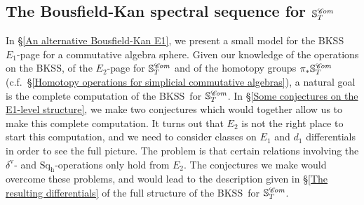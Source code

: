 \documentclass[11pt]{amsart} \renewcommand{\baselinestretch}{1.2}
\theoremstyle{plain}
\numberwithin{equation}{section} %
\theoremstyle{plain}
\numberwithin{equation}{chapter} %
\newcommand{\scrC}{\mathscr{C}}
\newcommand{\calw}{\mathcal{W}}
\newcommand{\calMhv}{\mathcal{M}_\mathrm{hv}}
\newcommand{\HA}[1]{H#1}
\newcommand{\quadgrad}[1]{\mathrm{q}_{#1}}
\newcommand{\algs}{{\scrC\!\textit{\normalfont\textit{om}}}}
\newcommand{\E}[5]{[E^{#1}_{#2}#3]^{#4}_{#5}}
\newcommand{\uver}{^\mathrm{v}}
\newcommand{\dhor}{_\mathrm{h}}
\newcommand{\Sqh}{\mathrm{Sq}\dhor}
\newcommand{\deltav}{\delta\uver}
\newcommand{\dual}{\mathbf{D}}
\newcommand{\BKSS}{BKSS}
\newcommand{\SubsectionOrSection}[1]{\subsection{#1}}
\begin{document}
\begin{Introduction}
\SubsectionOrSection{The Bousfield-Kan spectral sequence for $\mathbb{S}^{\algs}_T$}
\label{the BKSS for S introsection}
In \S\ref{An alternative Bousfield-Kan E1}, we present a small model for the \BKSS\ $E_1$-page for a commutative algebra sphere. 
Given our knowledge of the operations on the \BKSS, of the $E_2$-page for $\mathbb{S}^{\algs}_T$ and of the homotopy groups $\pi_*\mathbb{S}^{\algs}_T$ (c.f.\ \S\ref{Homotopy operations for simplicial commutative algebras}), a natural goal is the complete computation of the \BKSS\ for $\mathbb{S}^{\algs}_T$. In \S\ref{Some conjectures on the E1-level structure}, we make two conjectures which would together allow us to make this complete computation. It turns out that $E_2$ is not the right place to start this computation, and we need to consider classes on $E_1$ and $d_1$ differentials in order to see the full picture. The problem is that certain relations involving the $\deltav$- and $\Sqh$-operations only hold from $E_2$. The conjectures we make would overcome these problems, and would lead to the description given in \S\ref{The resulting differentials} of the full structure of the \BKSS\ for $\mathbb{S}^{\algs}_T$.



%
%
%




\end{Introduction}
\end{document}
